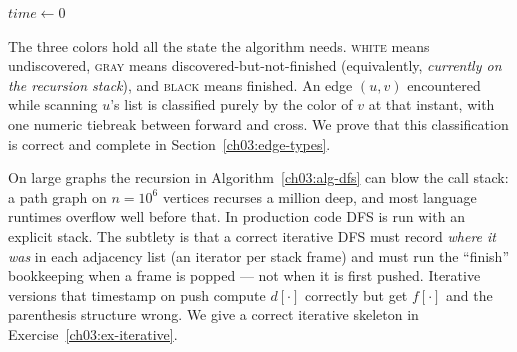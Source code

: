 \begin{algorithm}[H]
\DontPrintSemicolon
{}
\BlankLine
{}
$\mathit{time}\gets 0$\;
\BlankLine
{}
\caption{Depth-first search with timestamps and edge classification}
\label{ch03:alg-dfs}
\end{algorithm}

The three colors hold all the state the algorithm needs. \textsc{white} means undiscovered, \textsc{gray} means discovered-but-not-finished (equivalently, \emph{currently on the recursion stack}), and \textsc{black} means finished. An edge $(u,v)$ encountered while scanning $u$'s list is classified purely by the color of $v$ at that instant, with one numeric tiebreak between forward and cross. We prove that this classification is correct and complete in Section~\ref{ch03:edge-types}.

\begin{trapbox}
On large graphs the recursion in Algorithm~\ref{ch03:alg-dfs} can blow the call stack: a path graph on $n=10^6$ vertices recurses a million deep, and most language runtimes overflow well before that. In production code DFS is run with an explicit stack. The subtlety is that a correct iterative DFS must record \emph{where it was} in each adjacency list (an iterator per stack frame) and must run the ``finish'' bookkeeping when a frame is popped --- not when it is first pushed. Iterative versions that timestamp on push compute $d[\cdot]$ correctly but get $f[\cdot]$ and the parenthesis structure wrong. We give a correct iterative skeleton in Exercise~\ref{ch03:ex-iterative}.
\end{trapbox}

